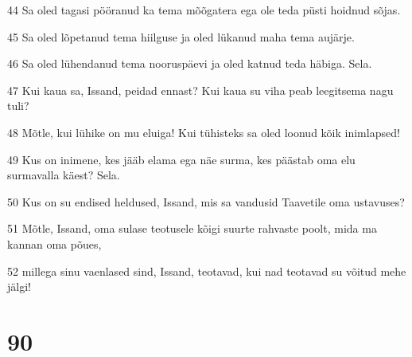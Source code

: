 \par 44 Sa oled tagasi pööranud ka tema mõõgatera ega ole teda püsti hoidnud sõjas.
\par 45 Sa oled lõpetanud tema hiilguse ja oled lükanud maha tema aujärje.
\par 46 Sa oled lühendanud tema nooruspäevi ja oled katnud teda häbiga. Sela.
\par 47 Kui kaua sa, Issand, peidad ennast? Kui kaua su viha peab leegitsema nagu tuli?
\par 48 Mõtle, kui lühike on mu eluiga! Kui tühisteks sa oled loonud kõik inimlapsed!
\par 49 Kus on inimene, kes jääb elama ega näe surma, kes päästab oma elu surmavalla käest? Sela.
\par 50 Kus on su endised heldused, Issand, mis sa vandusid Taavetile oma ustavuses?
\par 51 Mõtle, Issand, oma sulase teotusele kõigi suurte rahvaste poolt, mida ma kannan oma põues,
\par 52 millega sinu vaenlased sind, Issand, teotavad, kui nad teotavad su võitud mehe jälgi!

\chapter{90}

